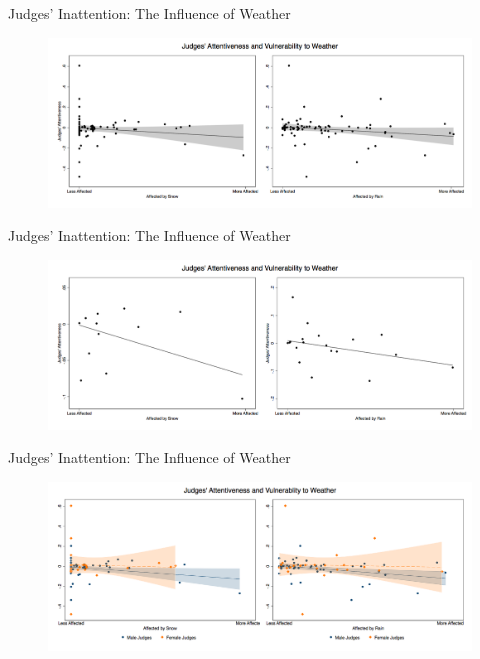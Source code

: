 \begin{frame}{Judges' Inattention: The Influence of Weather}
    \begin{figure}
        \centering
        \includegraphics[height = 0.7 \textheight]{images/weather_all.png}
    \end{figure}
\end{frame}

\begin{frame}{Judges' Inattention: The Influence of Weather}
    \begin{figure}
        \centering
        \includegraphics[height = 0.7 \textheight]{images/weather_bin.png}
    \end{figure}
\end{frame}

\begin{frame}{Judges' Inattention: The Influence of Weather}
    \begin{figure}
        \centering
        \includegraphics[height = 0.7 \textheight]{images/weather.png}
    \end{figure}
\end{frame}